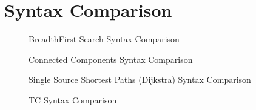 
\clearpage

\section{Syntax Comparison} \label{syntax}
\begin{figure}[ht]
\noindent\begin{minipage}{.499\textwidth}
{\small
      
}
\end{minipage}\hfill
\begin{minipage}{.499\textwidth}
{\small
      
}
\end{minipage}
\caption{Breadth\-First Search Syntax Comparison}
\end{figure}


\begin{figure}[ht]
\noindent\begin{minipage}{.499\textwidth}
{\small
      
}
\end{minipage}\hfill
\begin{minipage}{.499\textwidth}
{\small
      
}
\end{minipage}
\caption{Connected Components Syntax Comparison}
\end{figure}

\begin{figure}[ht]
\noindent\begin{minipage}{.499\textwidth}
{\small
      
}
\end{minipage}\hfill
\begin{minipage}{.499\textwidth}
{\small
      
}
\end{minipage}
\caption{Single Source Shortest Paths (Dijkstra) Syntax Comparison}
\end{figure}

\begin{figure}[ht]
\noindent\begin{minipage}{.499\textwidth}
{\small
      
}
\end{minipage}\hfill
\begin{minipage}{.499\textwidth}
{\small
      
}
\end{minipage}
\caption{TC Syntax Comparison}
\end{figure}


